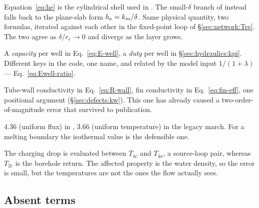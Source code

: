 \begin{description}[leftmargin=1.6em,itemsep=3pt]
\item[Melt-layer conductance $h_{e}$.] Equation~\eqref{eq:he} is the cylindrical
  shell used in . The small-$\delta$ branch of
   instead falls back to the plane-slab form
  $h_{e}=k_{m}/\delta$. Same physical quantity, two formulas, iterated against
  each other in the fixed-point loop of \S\ref{sec:network:Tre}. The two agree
  as $\delta/r_{e}\to0$ and diverge as the layer grows.
\item[$E_{\mathrm{well}}$.] A \emph{capacity} per well in
  Eq.~\eqref{eq:E-well}, a \emph{duty} per well in \S\ref{sec:hydraulics:kpi}.
  Different keys in the code, one name, and related by the model input
  $1/(1+\lambda)$ --- Eq.~\eqref{eq:Ewell-ratio}.
\item[$k_{w}$.] Tube-wall conductivity in Eq.~\eqref{eq:R-wall}, fin
  conductivity in Eq.~\eqref{eq:fin-eff}, one positional argument
  (\S\ref{sec:defects:kw}). This one has already caused a
  two-order-of-magnitude error that survived to publication.
\item[Laminar Nusselt number.] $4.36$ (uniform flux) in ,
  $3.66$ (uniform temperature) in the legacy march. For a melting boundary the
  isothermal value is the defensible one.
\item[Charging pressure-drop end states.] The charging drop is evaluated between
  $T_{4c}$ and $T_{4a}$, a source-loop pair, whereas $T_{2c}$ is the borehole
  return. The affected property is the water density, so the error is small, but
  the temperatures are not the ones the flow actually sees.
\end{description}

\subsection{Absent terms}

